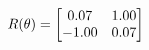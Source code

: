 \documentclass[preview]{standalone}
\begin{document}
\begin{align*}
\special{dvisvgm:raw <g id='unique000'>}R(\theta) = \begin{bmatrix}0.07 & 1.00\\-1.00 & 0.07\end{bmatrix}\special{dvisvgm:raw </g>}
\end{align*}
\end{document}
